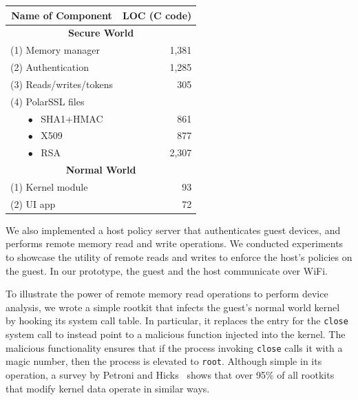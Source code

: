 \begin{table}[t!]
\footnotesize
\centering
\begin{tabular}{|l|r|}
\hline
\multicolumn{1}{|c|}{\bf Name of Component} & \multicolumn{1}{|c|}{\bf LOC (C code)}\\
\hline
\hline
\multicolumn{2}{|c|}{\bf Secure World}\\
\hline
(1) Memory manager            & 1,381\\
(2) Authentication            & 1,285\\
(3) Reads/writes/tokens       & 305\\
\hline
(4) PolarSSL files            & \\
~~~ $\bullet$ ~SHA1+HMAC      & 861\\
~~~ $\bullet$ ~X509           & 877\\
~~~ $\bullet$ ~RSA            & 2,307\\
\hline
\hline
\multicolumn{2}{|c|}{\bf Normal World}\\
\hline
(1) Kernel module             & 93\\
(2) UI app                    & 72\\
\hline
\end{tabular}
\end{table}

We also implemented a host policy server that authenticates guest devices, and
performs remote memory read and write operations. We conducted experiments to
showcase the utility of remote reads and writes to enforce the host's policies
on the guest. In our prototype, the guest and the host communicate over WiFi.

%
To illustrate the power of remote memory read operations to perform device
analysis, we wrote a simple rootkit that infects the guest's normal world
kernel by hooking its system call table. In particular, it replaces the entry
for the \texttt{close} system call to instead point to a malicious function
injected into the kernel. The malicious functionality ensures that if the
process invoking \texttt{close} calls it with a magic number, then the process
is elevated to \texttt{root}.  Although simple in its operation, a survey by
Petroni and Hicks~\cite{sbcfi:ccs07} shows that over 95\% of all rootkits that
modify kernel data operate in similar ways.

